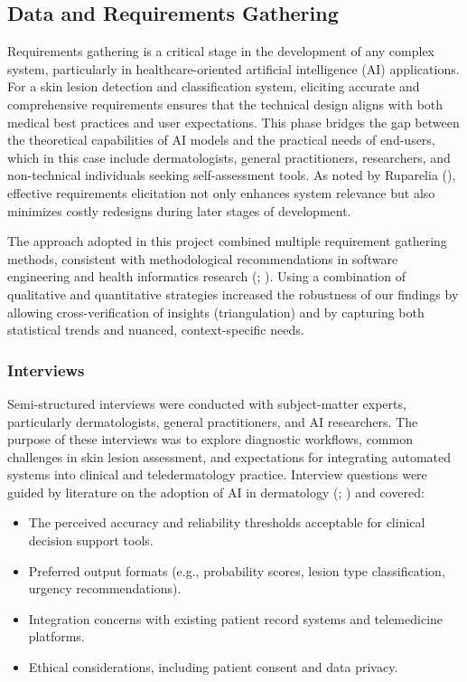 \documentclass[
  12pt,
  oneside]{article}
\providecommand{\tightlist}{%
  \setlength{\itemsep}{0pt}\setlength{\parskip}{0pt}}
\begin{document}
\subsection{Data and Requirements
Gathering}\label{data-and-requirements-gathering}

Requirements gathering is a critical stage in the development of any
complex system, particularly in healthcare-oriented artificial
intelligence (AI) applications. For a skin lesion detection and
classification system, eliciting accurate and comprehensive requirements
ensures that the technical design aligns with both medical best
practices and user expectations. This phase bridges the gap between the
theoretical capabilities of AI models and the practical needs of
end-users, which in this case include dermatologists, general
practitioners, researchers, and non-technical individuals seeking
self-assessment tools. As noted by Ruparelia
(), effective
requirements elicitation not only enhances system relevance but also
minimizes costly redesigns during later stages of development.

The approach adopted in this project combined multiple requirement
gathering methods, consistent with methodological recommendations in
software engineering and health informatics research
(;
). Using a combination of
qualitative and quantitative strategies increased the robustness of our
findings by allowing cross-verification of insights (triangulation) and
by capturing both statistical trends and nuanced, context-specific
needs.

\subsubsection{Interviews}\label{interviews}

Semi-structured interviews were conducted with subject-matter experts,
particularly dermatologists, general practitioners, and AI researchers.
The purpose of these interviews was to explore diagnostic workflows,
common challenges in skin lesion assessment, and expectations for
integrating automated systems into clinical and teledermatology
practice. Interview questions were guided by literature on the adoption
of AI in dermatology (; ) and
covered:

\begin{itemize}
\tightlist
\item
  The perceived accuracy and reliability thresholds acceptable for
  clinical decision support tools.
\item
  Preferred output formats (e.g., probability scores, lesion type
  classification, urgency recommendations).
\item
  Integration concerns with existing patient record systems and
  telemedicine platforms.
\item
  Ethical considerations, including patient consent and data privacy.
\end{itemize}
\end{document}
